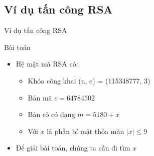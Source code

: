 



\subsection{Ví dụ tấn công RSA}
















\begin{frame}{Ví dụ tấn công RSA}

    \begin{block}{Bài toán}
        \begin{itemize}
        \item Hệ mật mã RSA có:
        
        \begin{itemize}
        \item Khóa công khai (n, e) = (115348777, 3)
        \item Bản mã  $c = 64784502$
        \item Bản rõ có dạng $m = 5180 + x$
        \item Với $x$ là phần bí mật thỏa mãn $|x| \leq 9$ 
        \end{itemize}
\item Để giải bài toán, chúng ta cần đi tìm $x$
        \end{itemize}
        
        \end{block}
\end{frame}


